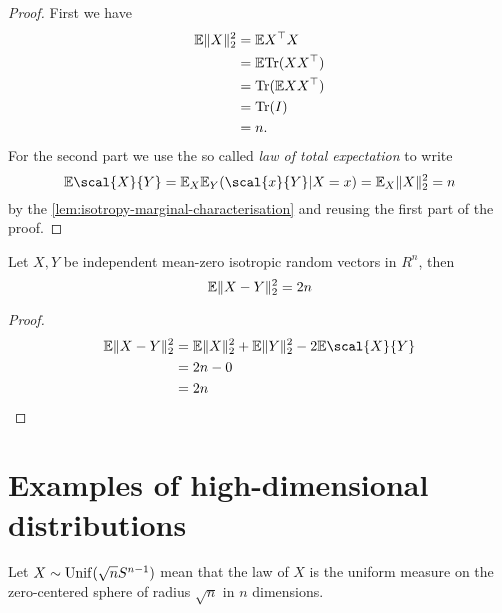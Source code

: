 \documentclass{article}
\begin{document}
\begin{proof}
  First we have
  \begin{align}
    \mathbb{E}\lVert X\rVert_{2}^{2} & = \mathbb{E} X^\top X \\
                       & = \mathbb{E} \mathrm{Tr}(X X^\top) \\
                       & = \mathrm{Tr}(\mathbb{E} X X^\top) \\
                       & = \mathrm{Tr}(I) \\
                       & = n.
  \end{align}
  For the second part we use the so called \emph{law of total expectation} to
  write
  \begin{equation}
    \E \scal{X}{Y} = \E_{X} \E_{Y}(\scal{x}{Y} | X = x) = \E_{X} \norm{X}_{2}^{2} = n
  \end{equation}
  by the \cref{lem:isotropy-marginal-characterisation} and reusing the first
  part of the proof.
\end{proof}

\begin{corollary}
  Let \(X, Y\) be independent mean-zero isotropic random vectors in \(R^{n}\),
  then
  \begin{equation}
    \mathbb{E} \lVert X - Y\rVert_{2}^{2} = 2n
  \end{equation}
\end{corollary}

\begin{proof}
  \begin{align}
    \E \norm{X - Y}_{2}^{2} & = \E \norm{X}_{2}^{2} + \E \norm{Y}_{2}^{2} - 2 \E \scal{X}{Y} \\
                            & = 2n - 0 \\
                            & = 2n
  \end{align}
\end{proof}

\section{Examples of high-dimensional distributions}
Let \(X \sim \mathrm{Unif}(\sqrt{n} S^{n-1})\) mean that the law of \(X\) is the uniform
measure on the zero-centered sphere of radius \(\sqrt{n}\) in \(n\) dimensions.

\begin{theorem}

\end{theorem}
\end{document}
